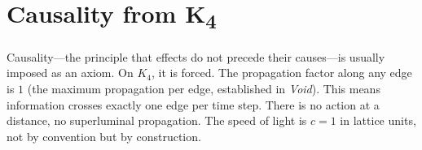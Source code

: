 \documentclass[11pt,a4paper]{book}
\begin{document}
\begin{code}
\>[0][@{}l@{\AgdaIndent{0}}]%
\>[2]\AgdaSymbol{\{}\AgdaSpace{}%
%
\>[18]\AgdaSymbol{=}\AgdaSpace{}%
\<%
\\
%
\>[2]\AgdaSymbol{;}\AgdaSpace{}%
%
\>[18]\AgdaSymbol{=}\AgdaSpace{}%
\<%
\\
%
\>[2]\AgdaSymbol{;}\AgdaSpace{}%
%
\>[18]\AgdaSymbol{=}\AgdaSpace{}%
\<%
\\
%
\>[2]\AgdaSymbol{;}\AgdaSpace{}%
%
\>[18]\AgdaSymbol{=}\AgdaSpace{}%
\<%
\\
%
\>[2]\AgdaSymbol{;}\AgdaSpace{}%
%
\>[18]\AgdaSymbol{=}\AgdaSpace{}%
\<%
\\
%
\>[2]\AgdaSymbol{;}\AgdaSpace{}%
%
\>[18]\AgdaSymbol{=}\AgdaSpace{}%
\<%
\\
%
\>[2]\AgdaSymbol{;}\AgdaSpace{}%
\AgdaSpace{}%
\AgdaSymbol{=}\AgdaSpace{}%
\<%
\\
%
\>[2]\AgdaSymbol{;}\AgdaSpace{}%
%
\>[18]\AgdaSymbol{=}\AgdaSpace{}%
\<%
\\
%
\>[2]\AgdaSymbol{;}\AgdaSpace{}%
%
\>[18]\AgdaSymbol{=}\AgdaSpace{}%
\<%
\\
%
\>[2]\AgdaSymbol{;}\AgdaSpace{}%
%
\>[18]\AgdaSymbol{=}\AgdaSpace{}%
\<%
\\
%
\>[2]\AgdaSymbol{;}\AgdaSpace{}%
%
\>[18]\AgdaSymbol{=}\AgdaSpace{}%
\<%
\\
%
\>[2]\AgdaSymbol{;}\AgdaSpace{}%
%
\>[18]\AgdaSymbol{=}\AgdaSpace{}%
\AgdaSpace{}%
\AgdaSymbol{\}}\<%
\end{code}

\section{Causality from K\textsubscript{4}}
\label{sec:causality}

Causality---the principle that effects do not precede their causes---is usually imposed as an axiom. On $K_4$, it is forced. The propagation factor along any edge is $1$ (the maximum propagation per edge, established in \textit{Void}). This means information crosses exactly one edge per time step. There is no action at a distance, no superluminal propagation. The speed of light is $c = 1$ in lattice units, not by convention but by construction.
\end{document}
